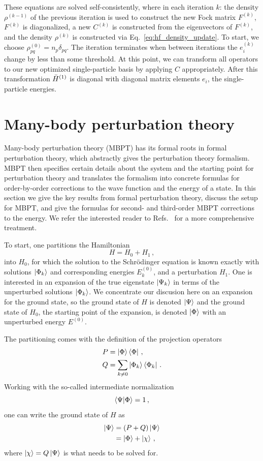 These equations are solved self-consistently,
where in each iteration $k$:
the density $\rho^{(k-1)}$ of the previous iteration
is used to construct the new Fock matrix $F^{(k)}$,
$F^{(k)}$ is diagonalized,
a new $C^{(k)}$ is constructed from the eigenvectors of $F^{(k)}$,
and the density $\rho^{(k)}$ is constructed via Eq.~\ref{eq:hf_density_update}.
To start, we choose $\rho^{(0)}_{pq} = n_p \delta_{pq}$.
The iteration terminates when between iterations
the $e_{i}^{(k)}$ change by less than some threshold.
At this point, we can transform all operators to our new optimized single-particle basis
by applying $C$ appropriately.
After this transformation ${\bar{H}}^{(1)}$ is diagonal with diagonal matrix elements $e_i$,
the single-particle energies.

\section{Many-body perturbation theory}\label{sec:mbpt}

Many-body perturbation theory (MBPT) has its formal roots in formal perturbation theory,
which abstractly gives the perturbation theory formalism.
MBPT then specifies certain details about the system
and the starting point for perturbation theory
and translates the formalism into concrete formulas
for order-by-order corrections to the wave function and the energy of a state.
In this section we give the key results from formal perturbation theory,
discuss the setup for MBPT,
and give the formulas for second- and third-order MBPT corrections to the energy.
We refer the interested reader to Refs.~\cite{Shav09mbpt_cc_book,Tich20mbptreview}
for a more comprehensive treatment.

To start, one partitions the Hamiltonian
\begin{equation}
  H = H_0 + H_1\,,
\end{equation}
into $H_0$,
for which the solution to the Schr\"{o}dinger equation is known exactly
with solutions $\ket{\Phi_k}$ and corresponding energies $E^{(0)}_{k}$,
and a perturbation $H_1$.
One is interested in an expansion of the true eigenstate $\ket{\Psi_k}$
in terms of the unperturbed solutions $\ket{\Phi_k}$.
We concentrate our discusion here on an expansion for the ground state,
so the ground state of $H$ is denoted $\ket{\Psi}$
and the ground state of $H_0$,
the starting point of the expansion,
is denoted $\ket{\Phi}$ with an unperturbed energy $E^{(0)}$.

The partitioning comes with the definition of the projection operators
\begin{align}
  P &= \ket{\Phi}\bra{\Phi}\,, \\
  Q &= \sum_{k\neq 0}\ket{\Phi_k}\bra{\Phi_k}\,.
\end{align}
Working with the so-called intermediate normalization
\begin{equation}
  \braket{\Psi|\Phi} = 1\,,
\end{equation}
one can write the ground state of $H$ as
\begin{align}
  \ket{\Psi} &= (P + Q)\ket{\Psi} \\
  &= \ket{\Phi} + \ket{\chi}\,,
\end{align}
where $\ket{\chi} = Q \ket{\Psi}$ is what needs to be solved for.

